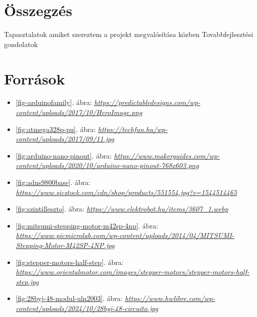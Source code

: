 \documentclass[]{thesis-ekf}
\theoremstyle{definition}
\theoremstyle{remark}
\begin{document}
\chapter*{Összegzés}
Tapasztalatok amiket szereztem a projekt megvalósítása közben
Tovabbfejlesztési gondolatok

\chapter*{Források}
\begin{itemize}
	\item \ref{fig-arduinofamily}. ábra: \emph{\url{https://predictabledesigns.com/wp-content/uploads/2017/10/HeroImage.png}}
	\item \ref{fig:atmega328p-pu}. ábra: \emph{\url{https://techfun.hu/wp-content/uploads/2017/09/11.jpg}}
	\item \ref{fig:arduino-nano-pinout}. ábra: \emph{\url{https://www.makerguides.com/wp-content/uploads/2020/10/arduino-nano-pinout-768x603.png}}
	\item \ref{fig:adns9800base}. ábra: \emph{\url{https://www.sicstock.com/cdn/shop/products/551554.jpg?v=1544514465}}
	\item \ref{fig:szintilleszto}. ábra: \emph{\url{https://www.elektrobot.hu/items/3607_1.webp}}
	\item \ref{fig:mitsumi-stepping-motor-m42sp-4np}. ábra: \emph{\url{https://www.picmicrolab.com/wp-content/uploads/2014/04/MITSUMI-Stepping-Motor-M42SP-4NP.jpg}}
	\item \ref{fig:stepper-motors-half-step}. ábra: \emph{\url{https://www.orientalmotor.com/images/stepper-motors/stepper-motors-half-step.jpg}}
	\item \ref{fig:28byj-48-modul-uln2003}. ábra: \emph{\url{https://www.hwlibre.com/wp-content/uploads/2024/10/28byj-48-circuito.jpg}}
\end{itemize}
\end{document}
